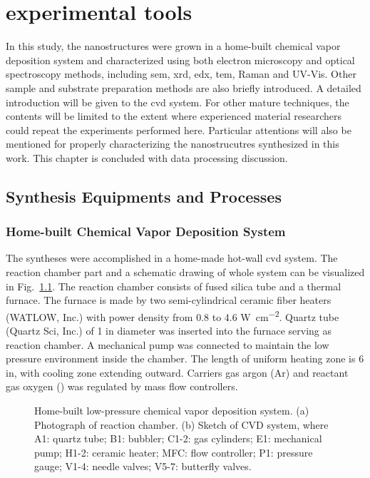 
\chapter{experimental tools}

In this study, the nanostructures were grown in a home-built chemical vapor deposition system and characterized using both electron microscopy and optical spectroscopy methods, including \gls{sem}, \gls{xrd}, \gls{edx}, \gls{tem}, Raman and UV-Vis. Other sample and substrate preparation methods are also briefly introduced. A detailed introduction will be given to the \gls{cvd} system. For other mature techniques, the contents will be limited to the extent where experienced material researchers could repeat the experiments performed here. Particular attentions will also be mentioned for properly characterizing the nanostrucutres synthesized in this work. This chapter is concluded with data processing discussion. 

\section{Synthesis Equipments and Processes}
\subsection{Home-built Chemical Vapor Deposition System}
The syntheses were accomplished in a home-made hot-wall \gls{cvd} system. The reaction chamber part and a schematic drawing of whole system can be visualized in Fig.~\ref{fig:ch2cvd}.  The reaction chamber consists of fused silica tube and a thermal furnace. The furnace is made by two semi-cylindrical ceramic fiber heaters (WATLOW, Inc.) with power density from 0.8 to 4.6 \si{W cm^{-2}}. Quartz tube (Quartz Sci, Inc.) of 1 in diameter was inserted into the furnace serving as reaction chamber. A mechanical pump was connected to maintain the low pressure environment inside the chamber. The length of uniform heating zone is 6 in, with cooling zone extending outward. Carriers gas argon (Ar) and reactant gas oxygen () was regulated by mass flow controllers.

\begin{figure}[htb]
\centering
{}

\caption[Home-built low-pressure chemical vapor deposition system]{Home-built low-pressure chemical vapor deposition system. (a) Photograph of reaction chamber. (b) Sketch of CVD system, where A1: quartz tube; B1: bubbler; C1-2: gas cylinders; E1: mechanical pump; H1-2: ceramic heater; MFC: flow controller; P1: pressure gauge; V1-4: needle valves; V5-7: butterfly valves.}
\label{fig:ch2cvd}
\end{figure}

